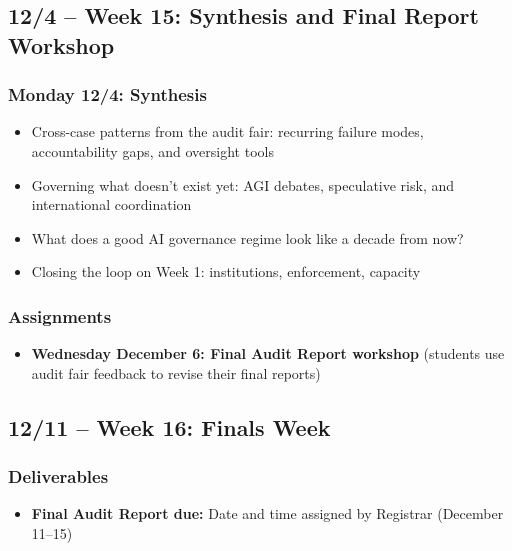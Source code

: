 \documentclass[12pt]{article}
\begin{document}
\subsection*{12/4 -- Week 15: Synthesis and Final Report Workshop}
    \subsubsection*{Monday 12/4: Synthesis}
        \begin{itemize}
            \item Cross-case patterns from the audit fair: recurring failure modes, accountability gaps, and oversight tools
            \item Governing what doesn't exist yet: AGI debates, speculative risk, and international coordination
            \item What does a good AI governance regime look like a decade from now?
            \item Closing the loop on Week 1: institutions, enforcement, capacity
        \end{itemize}
    \subsubsection*{Assignments}
        \begin{itemize}
            \item \textbf{Wednesday December 6: Final Audit Report workshop} (students use audit fair feedback to revise their final reports)
        \end{itemize}

\subsection*{12/11 -- Week 16: Finals Week}
    \subsubsection*{Deliverables}
        \begin{itemize}
            \item \textbf{Final Audit Report due:} Date and time assigned by Registrar (December 11--15)
        \end{itemize}

\bigskip
\renewcommand{\refname}{Appendix: Reading List}
\renewcommand{\bibpreamble}{%
    \noindent Full citations for the assigned readings listed in the course schedule above. All items other than the required book are provided through \emph{Canvas} and the Pollak Library at no cost. Readings marked in the schedule as updated each offering (current investigative reporting, case dossiers, and regulatory trackers) are posted to \emph{Canvas} at the start of the semester and are not listed here.\par\vspace{0.75\baselineskip}}
\end{document}
